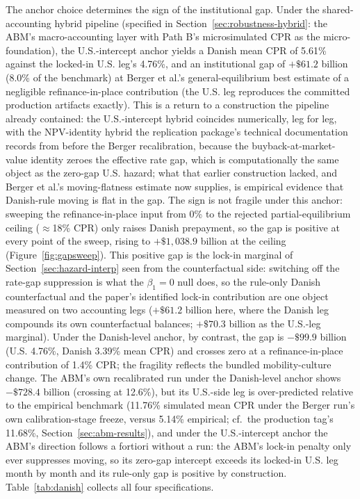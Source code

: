 \documentclass[12pt]{article}
\begin{document}
The anchor choice determines the sign of the institutional gap. Under the shared-accounting hybrid pipeline (specified in Section~\ref{sec:robustness-hybrid}: the ABM's macro-accounting layer with Path B's microsimulated CPR as the micro-foundation), the U.S.-intercept anchor yields a Danish mean CPR of 5.61\% against the locked-in U.S. leg's 4.76\%, and an institutional gap of $+\$61.2$ billion (8.0\% of the benchmark) at Berger et al.'s general-equilibrium best estimate of a negligible refinance-in-place contribution (the U.S. leg reproduces the committed production artifacts exactly). This is a return to a construction the pipeline already contained: the U.S.-intercept hybrid coincides numerically, leg for leg, with the NPV-identity hybrid the replication package's technical documentation records from before the Berger recalibration, because the buyback-at-market-value identity zeroes the effective rate gap, which is computationally the same object as the zero-gap U.S. hazard; what that earlier construction lacked, and Berger et al.'s moving-flatness estimate now supplies, is empirical evidence that Danish-rule moving is flat in the gap. The sign is not fragile under this anchor: sweeping the refinance-in-place input from 0\% to the rejected partial-equilibrium ceiling ($\approx$18\% CPR) only raises Danish prepayment, so the gap is positive at every point of the sweep, rising to $+\$1{,}038.9$ billion at the ceiling (Figure~\ref{fig:gapsweep}). This positive gap is the lock-in marginal of Section~\ref{sec:hazard-interp} seen from the counterfactual side: switching off the rate-gap suppression is what the $\beta_1 = 0$ null does, so the rule-only Danish counterfactual and the paper's identified lock-in contribution are one object measured on two accounting legs ($+\$61.2$ billion here, where the Danish leg compounds its own counterfactual balances; $+\$70.3$ billion as the U.S.-leg marginal). Under the Danish-level anchor, by contrast, the gap is $-\$99.9$ billion (U.S. 4.76\%, Danish 3.39\% mean CPR) and crosses zero at a refinance-in-place contribution of 1.4\% CPR; the fragility reflects the bundled mobility-culture change. The ABM's own recalibrated run under the Danish-level anchor shows $-\$728.4$ billion (crossing at 12.6\%), but its U.S.-side leg is over-predicted relative to the empirical benchmark (11.76\% simulated mean CPR under the Berger run's own calibration-stage freeze, versus 5.14\% empirical; cf.\ the production tag's 11.68\%, Section~\ref{sec:abm-results}), and under the U.S.-intercept anchor the ABM's direction follows a fortiori without a run: the ABM's lock-in penalty only ever suppresses moving, so its zero-gap intercept exceeds its locked-in U.S. leg month by month and its rule-only gap is positive by construction. Table~\ref{tab:danish} collects all four specifications.
\end{document}
